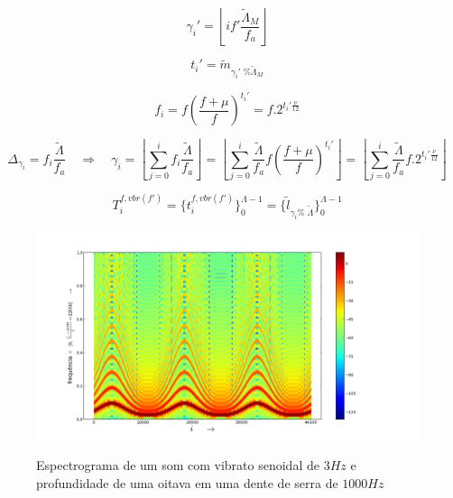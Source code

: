 \begin{equation}\label{vbrGamma}
\gamma_i'=\left \lfloor i f' \frac{\widetilde{\Lambda}_M}{f_a} \right \rfloor
\end{equation}

\begin{equation}\label{vbrAux}
t_i'=\widetilde{m}_{\gamma_i' \;\% \widetilde{\Lambda}_M}
\end{equation}

\begin{equation}\label{vbrF}
f_i=f \left ( \frac{f + \mu }{f} \right )^{t_i'}=f . 2^{t_i'\frac{\nu}{12}}
\end{equation}

\begin{equation}\label{vbrGamma}
\Delta_{\gamma_i}=f_i\frac{\widetilde{\Lambda}}{f_a} \quad \Rightarrow \quad \gamma_i = \left \lfloor \sum_{j=0}^{i} f_i \frac{\widetilde{\Lambda}}{f_a} \right \rfloor = \left \lfloor \sum_{j=0}^{i} \frac{\widetilde{\Lambda}}{f_a}f \left ( \frac{f + \mu }{f} \right )^{t_i'}  \right \rfloor= \left \lfloor \sum_{j=0}^{i} \frac{\widetilde{\Lambda}}{f_a}f . 2^{t_i'\frac{\nu}{12}}  \right \rfloor
\end{equation}

\begin{equation}\label{vbrT}
T_i^{f, vbr(f')}=\{ t_i^{f,vbr(f')} \}_0^{\Lambda-1}=\{ \widetilde{l}_{\gamma_i \%\; \widetilde{\Lambda} } \}_0^{\Lambda-1}
\end{equation}


\begin{figure}[h!]
    \centering
    \caption{Espectrograma de um som com vibrato senoidal de $3Hz$ e profundidade de uma oitava em uma dente de serra de $1000Hz$}
        \includegraphics[width=\textwidth]{figuras/vibrato___}
        \label{fig:vibrato}
\end{figure}

